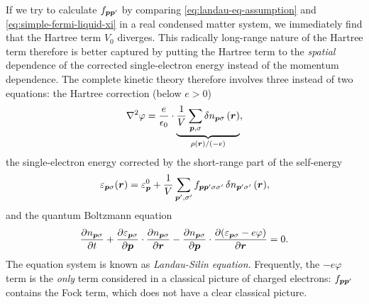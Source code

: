 \documentclass[hyperref, a4paper]{article}
\begin{document}
If we try to calculate $f_{\vb*{p} \vb*{p}'}$ by 
comparing \eqref{eq:landau-eq-assumption} and \eqref{eq:simple-fermi-liquid-xi}
in a real condensed matter system,
we immediately find that the Hartree term $V_0$ diverges.
This radically long-range nature of the Hartree term therefore 
is better captured by 
putting the Hartree term to the 
\emph{spatial} dependence of the corrected single-electron energy 
instead of the momentum dependence.
The complete kinetic theory therefore involves three instead of two equations:
the Hartree correction (below $e > 0$)
\begin{equation}
    \laplacian \varphi = \frac{e}{\epsilon_0} 
    \cdot \underbrace{
        \frac{1}{V} \sum_{\vb*{p}, \sigma} \var{n}_{\vb*{p} \sigma}(\vb*{r})
    }_{\rho(\vb*{r}) / (-e)},
\end{equation}
the single-electron energy corrected by 
the short-range part of the self-energy
\begin{equation}
    \varepsilon_{\vb*{p} \sigma}(\vb*{r}) = \varepsilon^0_{\vb*{p}} 
        + \frac{1}{V} \sum_{\vb*{p}', \sigma'} 
        f_{\vb*{p} \vb*{p}' \sigma \sigma'} \var{n}_{\vb*{p}' \sigma'}(\vb*{r}),
\end{equation}
and the quantum Boltzmann equation 
\begin{equation}
    \pdv{{n}_{\vb*{p} \sigma}}{t}  
    + \pdv{\varepsilon_{\vb*{p} \sigma}}{\vb*{p}} \cdot \pdv{{n}_{\vb*{p} \sigma}}{\vb*{r}}
    - \pdv{{n}_{\vb*{p} \sigma}}{\vb*{p}} \cdot \pdv{(\varepsilon_{\vb*{p} \sigma} - e \varphi)}{\vb*{r}} = 0.
\end{equation}
The equation system is known as \emph{Landau-Silin equation}.
Frequently, the $-e \varphi$ term is the \emph{only} term 
considered in a classical picture of charged electrons:
$f_{\vb*{p} \vb*{p}'}$ contains the Fock term,
which does not have a clear classical picture.
\end{document}
